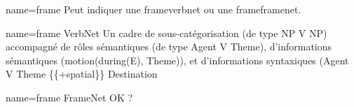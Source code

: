 
{name={frame}}
{Peut indiquer une \gls{frameverbnet} ou une \gls{frameframenet}.}

{name={frame VerbNet}}
{Un cadre de sous-catégorisation (de type NP V NP) accompagné de rôles sémantiques (de type Agent V Theme), d'informations sémantiques (motion(during(E), Theme)), et d'informations syntaxiques (Agent V Theme \{\{+spatial\}\} Destination}

{name={frame FrameNet}}
{OK ?}
